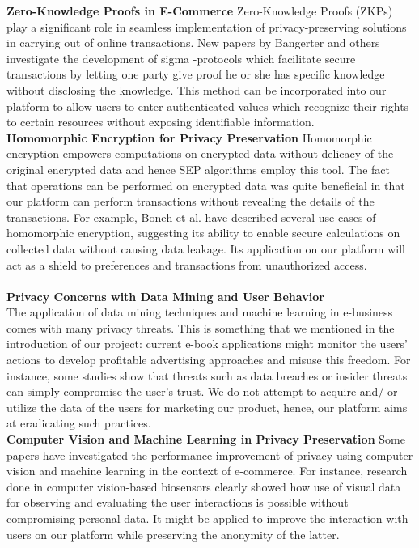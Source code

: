 \documentclass[12pt]{article}
\begin{document}
\textbf{Zero-Knowledge Proofs in E-Commerce}
Zero-Knowledge Proofs (ZKPs) play a significant role in seamless implementation of privacy-preserving solutions in carrying out of online transactions. New papers by Bangerter and others investigate the development of sigma -protocols which facilitate secure transactions by letting one party give proof he or she has specific knowledge without disclosing the knowledge. This method can be incorporated into our platform to allow users to enter authenticated values which recognize their rights to certain resources without exposing identifiable information.~\cite{Bangerter2010}\\

\textbf{Homomorphic Encryption for Privacy Preservation}
Homomorphic encryption empowers computations on encrypted data without delicacy of the original encrypted data and hence SEP algorithms employ this tool. The fact that operations can be performed on encrypted data was quite beneficial in that our platform can perform transactions without revealing the details of the transactions. For example, Boneh et al. have described several use cases of homomorphic encryption, suggesting its ability to enable secure calculations on collected data without causing data leakage. Its application on our platform will act as a shield to preferences and transactions from unauthorized access.~\cite{Boneh2005}
\\\\

\textbf{Privacy Concerns with Data Mining and User Behavior}\\
The application of data mining techniques and machine learning in e-business comes with many privacy threats. This is something that we mentioned in the introduction of our project: current e-book applications might monitor the users’ actions to develop profitable advertising approaches and misuse this freedom. For instance, some studies show that threats such as data breaches or insider threats can simply compromise the user’s trust. We do not attempt to acquire and/ or utilize the data of the users for marketing our product, hence, our platform aims at eradicating such practices.~\cite{Yang2019}
\\

\textbf{Computer Vision and Machine Learning in Privacy Preservation}
Some papers have investigated the performance improvement of privacy using computer vision and machine learning in the context of e-commerce. For instance, research done in computer vision-based biosensors clearly showed how use of visual data for observing and evaluating the user interactions is possible without compromising personal data. It might be applied to improve the interaction with users on our platform while preserving the anonymity of the latter.~\cite{Chaum2007}\\
\end{document}
